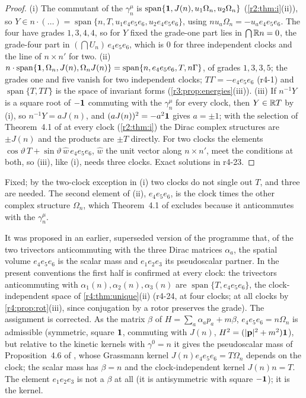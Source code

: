 \begin{proof}
(i) The commutant of the $\gamma^\mu_n$ is $\operatorname{span}\{\mathbf 1,J(n),u_1\Omega_n,u_2\Omega_n\}$ (\cref{r2:thm:i}(ii)), so $Y\in n\cdot(\ldots)=\operatorname{span}\{n,T,u_1e_4e_5e_6,u_2e_4e_5e_6\}$, using
$nu_a\Omega_n=-u_ae_4e_5e_6$. The four have grades $1,3,4,4$, so for $Y$ fixed the grade-one part lies in $\bigcap\mathbb{R} n=0$, the grade-four part in $(\bigcap U_n)\,e_4e_5e_6$,
which is $0$ for three independent clocks and the line of $n\times n'$ for two. (ii) $n\cdot\operatorname{span}\{\mathbf 1,\Omega_n,J(n),\Omega_nJ(n)\}=\operatorname{span}\{n,e_4e_5e_6,T,n\Gamma\}$, of grades
$1,3,3,5$; the grades one and five vanish for two independent clocks; $T\Gamma=-e_4e_5e_6$ (r4-1) and $\operatorname{span}\{T,T\Gamma\}$ is the space of invariant forms
(\cref{r3:prop:energies}(iii)). (iii) If $n^{-1}Y$ is a square root of $-\mathbf 1$ commuting with the $\gamma^\mu_n$ for every clock, then $Y\in\mathbb{R} T$ by (i), so
$n^{-1}Y=aJ(n)$, and $(aJ(n))^2=-a^2\mathbf 1$ gives $a=\pm1$; with the selection of Theorem~4.1 of \cite{ES17} at every clock (\cref{r2:thm:i}) the Dirac
complex structures are $\pm J(n)$ and the products are $\pm T$ directly. For two clocks the elements $\cos\vartheta\,T+\sin\vartheta\,\hat w\,e_4e_5e_6$,
$\hat w$ the unit vector along $n\times n'$, meet the conditions at both, so (iii), like (i), needs three clocks. Exact solutions in r4-23.
\end{proof}

Fixed; by the two-clock exception in (i) two clocks do not single out $T$, and three are needed. The second element of (ii), $e_4e_5e_6$, is the
clock times the other complex structure $\Omega_n$, which Theorem~4.1 of \cite{ES17} excludes because it anticommutes with the $\gamma^\mu_n$.

\begin{remark}
\label{r4:rem:V}
It was proposed in an earlier, superseded version of the programme that, of the two trivectors anticommuting with the three Dirac matrices
$\alpha_a$, the spatial volume $e_4e_5e_6$ is the scalar mass and $e_1e_2e_3$ its pseudoscalar partner. In the present conventions the first half is
confirmed at every clock: the trivectors anticommuting with $\alpha_1(n),\alpha_2(n),\alpha_3(n)$ are $\operatorname{span}\{T,e_4e_5e_6\}$, the clock-independent space of
\cref{r4:thm:unique}(ii) (r4-24, at four clocks; at all clocks by \cref{r4:prop:rot}(iii), since conjugation by a rotor preserves the grade). The assignment is corrected. As the matrix $\beta$ of $H=\sum_a\alpha_ap_a+m\beta$, $e_4e_5e_6=n\Omega_n$ is admissible
(symmetric, square $\mathbf 1$, commuting with $J(n)$, $H^2=(|\mathbf p|^2+m^2)\mathbf 1$), but relative to the kinetic kernels with $\gamma^0=n$ it gives the pseudoscalar mass
of Proposition~4.6 of \cite{ES17}, whose Grassmann kernel $J(n)e_4e_5e_6=T\Omega_n$ depends on the clock; the scalar mass has $\beta=n$ and the
clock-independent kernel $J(n)n=T$. The element $e_1e_2e_3$ is not a $\beta$ at all (it is antisymmetric with square $-\mathbf 1$); it is the kernel.
\end{remark}

